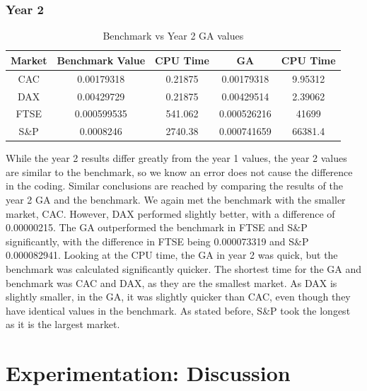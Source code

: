 \documentclass[12pt]{report}
\begin{document}
{\subsubsection*{Year 2}
\begin{table}[h!]
\centering
\begin{tabular}{| c | c | c | c | c |} 
\hline
\rowcolor{lightgray}
Market & Benchmark Value & CPU Time & GA & CPU Time\\
\hline
CAC & 0.00179318 &  0.21875 & 0.00179318 & 9.95312\\
\hline
DAX & 0.00429729 & 0.21875 & 0.00429514 & 2.39062\\
\hline
FTSE & 0.000599535 & 541.062 & 0.000526216 & 41699 \\
\hline
S\&P & 0.0008246   & 2740.38   & 0.000741659 & 66381.4 \\
\hline
\end{tabular}
\caption{Benchmark vs Year 2 GA values}
\label{table:benchyear2}
\end{table}
\noindent
While the year 2 results differ greatly from the year 1 values, the year 2 values are similar to the benchmark, so we know an error does not cause the difference in the coding. Similar conclusions are reached by comparing the results of the year 2 GA and the benchmark.
We again met the benchmark with the smaller market, CAC. However, DAX performed slightly better, with a difference of 0.00000215. The GA outperformed the benchmark in FTSE and S\&P significantly, with the difference in FTSE being 0.000073319 and S\&P 0.000082941. Looking at the CPU time, the GA in year 2 was quick, but the benchmark was calculated significantly quicker. The shortest time for the GA and benchmark was CAC and DAX, as they are the smallest market. As DAX is slightly smaller, in the GA, it was slightly quicker than CAC, even though they have identical values in the benchmark. As stated before, S\&P took the longest as it is the largest market.



\section{Experimentation: Discussion}


}
\end{document}
